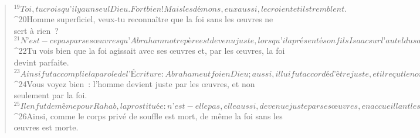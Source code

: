 \begin{verse}
${}^{19}Toi, tu crois qu’il y a un seul Dieu. Fort bien ! Mais les démons, eux aussi, le croient et ils tremblent.
${}^{20}Homme superficiel, veux-tu reconnaître que la foi sans les œuvres ne sert à rien ? 
${}^{21}N’est-ce pas par ses œuvres qu’Abraham notre père est devenu juste, lorsqu’il a présenté son fils Isaac sur l’autel du sacrifice ? 
${}^{22}Tu vois bien que la foi agissait avec ses œuvres et, par les œuvres, la foi devint parfaite. 
${}^{23}Ainsi fut accomplie la parole de l’Écriture : Abraham eut foi en Dieu ; aussi, il lui fut accordé d’être juste, et il reçut le nom d’ami de Dieu. » 
${}^{24}Vous voyez bien : l’homme devient juste par les œuvres, et non seulement par la foi. 
${}^{25}Il en fut de même pour Rahab, la prostituée : n’est-elle pas, elle aussi, devenue juste par ses œuvres, en accueillant les envoyés de Josué et en les faisant repartir par un autre chemin ? 
${}^{26}Ainsi, comme le corps privé de souffle est mort, de même la foi sans les œuvres est morte.
      

\end{verse}
